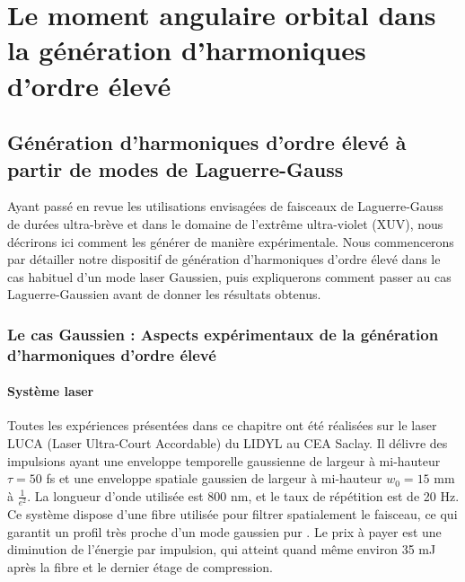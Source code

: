 \chapter{Le moment angulaire orbital dans la génération d'harmoniques d'ordre élevé}
\label{CH:OAM_HHG}
%
\section{Génération d'harmoniques d'ordre élevé à partir de modes de Laguerre-Gauss}

Ayant passé en revue les utilisations envisagées de faisceaux de Laguerre-Gauss de durées ultra-brève et dans le domaine de l'extrême ultra-violet (XUV), nous décrirons ici comment les générer de manière expérimentale. Nous commencerons par détailler notre dispositif de génération d'harmoniques d'ordre élevé dans le cas habituel d'un mode laser Gaussien, puis expliquerons comment passer au cas Laguerre-Gaussien avant de donner les résultats obtenus.

\subsection{Le cas Gaussien : Aspects expérimentaux de la génération d'harmoniques d'ordre élevé}
\label{Sec:HHG_G}
\subsubsection{Système laser}
Toutes les expériences présentées dans ce chapitre ont été réalisées sur le laser LUCA (Laser Ultra-Court Accordable) du LIDYL au CEA Saclay. Il délivre des impulsions ayant une enveloppe temporelle gaussienne de largeur à mi-hauteur $\tau = 50$ fs et une enveloppe spatiale gaussien de largeur à mi-hauteur $w_0 = 15$ mm à $\frac{1}{e^2}$. La longueur d'onde utilisée est 800 nm, et le taux de répétition est de 20 Hz. Ce système dispose d'une fibre utilisée pour filtrer spatialement le faisceau, ce qui garantit un profil très proche d'un mode gaussien pur . Le prix à payer est une diminution de l'énergie par impulsion, qui atteint quand même environ 35 mJ après la fibre et le dernier étage de compression.

